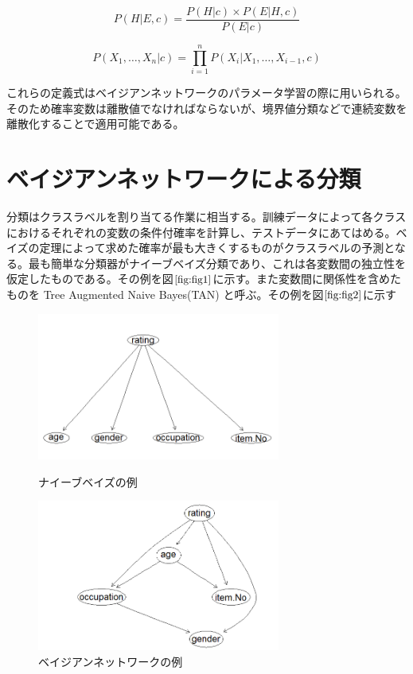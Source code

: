\documentclass[a4j,12pt]{jarticle}
\begin{document}
\begin{equation}
\label{eq:eq1}
P(H|E,c) = \frac{P(H|c) \times P(E|H,c)}{P(E|c)}
\end{equation}

\begin{equation}
\label{eq:eq2}
P(X_1, \ldots, X_n|c) = \prod_{i=1}^n P(X_i|X_1, \ldots, X_{i-1},c)
\end{equation}

これらの定義式はベイジアンネットワークのパラメータ学習の際に用いられる。そのため確率変数は離散値でなければならないが、境界値分類などで連続変数を離散化することで適用可能である。

\section{ベイジアンネットワークによる分類}

分類はクラスラベルを割り当てる作業に相当する。訓練データによって各クラスにおけるそれぞれの変数の条件付確率を計算し、テストデータにあてはめる。ベイズの定理によって求めた確率が最も大きくするものがクラスラベルの予測となる。最も簡単な分類器がナイーブベイズ分類であり、これは各変数間の独立性を仮定したものである。その例を図$\ref{fig:fig1}$に示す。また変数間に関係性を含めたものを Tree Augmented Naive Bayes(TAN) と呼ぶ。その例を図$\ref{fig:fig2}$に示す

\begin{figure}[H]
\begin{minipage}{0.5\hsize}
 \begin{center}
  \includegraphics[width=80mm]{data/sample1.png}
 \end{center}
 \caption{ナイーブベイズの例}
 \label{fig:fig1}
 \end{minipage}
\begin{minipage}{0.5\hsize}
 \begin{center}
  \includegraphics[width=80mm]{data/sample2.png}
 \end{center}
 \caption{ベイジアンネットワークの例}
 \label{fig:fig2}
 \end{minipage}
\end{figure}
\end{document}
